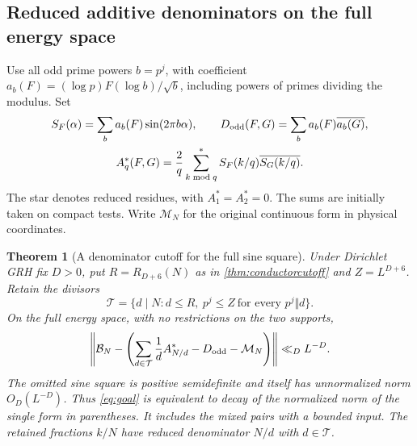 \documentclass[11pt,a4paper]{article}
\numberwithin{equation}{section}
\newtheorem{theorem}{Theorem}[section]
\newcommand{\B}{\mathcal B_N}
\begin{document}
\subsection{Reduced additive denominators on the full energy space}

Use all odd prime powers $b=p^j$, with coefficient
$a_b(F)=(\log p)F(\log b)/\sqrt b$, including powers of primes
dividing the modulus. Set
\[
 \begin{gathered}
 S_F(\alpha)=\sum_b a_b(F)\sin(2\pi b\alpha),\qquad
 D_{\rm odd}(F,G)=\sum_b a_b(F)\overline{a_b(G)},\\
 A_q^*(F,G)=\frac2q\sum_{k\bmod q}^{*}
                 S_F(k/q)\overline{S_G(k/q)} .
 \end{gathered}
\]
The star denotes reduced residues, with $A_1^*=A_2^*=0$.
The sums are initially taken on compact tests. Write $\mathcal M_N$
for the original continuous form in physical coordinates.

\begin{theorem}[A denominator cutoff for the full sine square]
\label{thm:full-sine-denominators}
Under Dirichlet GRH fix $D>0$, put $R=R_{D+6}(N)$ as in
\cref{thm:conductorcutoff} and $Z=L^{D+6}$. Retain the divisors
\[
 \mathcal T=\{d\mid N:d\le R,\ p^j\le Z\ \text{for every }p^j\Vert d\}.
\]
On the full energy space, with no restrictions on the two supports,
\begin{equation}
 \left\|\B-
 \left(\sum_{d\in\mathcal T}\frac1d A_{N/d}^*
             -D_{\rm odd}-\mathcal M_N\right)\right\|
 \ll_D L^{-D}.
 \label{eq:full-sine-denominators}
\end{equation}
The omitted sine square is positive semidefinite and itself has
unnormalized norm $O_D(L^{-D})$. Thus \eqref{eq:goal} is equivalent
to decay of the normalized norm of the single form in parentheses.
It includes the mixed pairs with a bounded input. The retained
fractions $k/N$ have reduced denominator $N/d$ with $d\in\mathcal T$.
\end{theorem}
\end{document}
